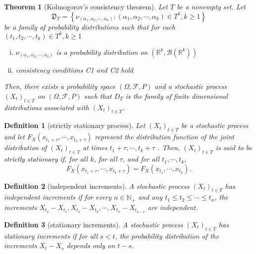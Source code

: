 \documentclass{report}
\newtheorem{definition}{Definition}[section]
\newtheorem{theorem}{Theorem}[section]
\theoremstyle{nonumberplain}
\begin{document}
\begin{theorem}[Kolmogorov's consistency theorem]
	Let $T$ be a nonempty set. Let 
	$$
	\mathfrak{D}_{T} =\left\{\nu_{\left(\alpha_{1}, \alpha_{2}, \cdots, \alpha_{k}\right)}:\left(\alpha_{1}, \alpha_{2}, \cdots, \alpha_{k}\right) \in T^{k}, k\ge1 \right\}
	$$
	be a family of probability distributions such that for each $\left(t_{1}, t_{2}, \cdots, t_{k}\right) \in T^k,k\ge1$
	\begin{enumerate}[(i)]
		\item $\nu_{\left(\alpha_{1}, \alpha_{2}, \cdots, \alpha_{k}\right)}$ is a probability distribution on $\left(\mathbb{R}^{k}, \mathcal{B}\left(\mathbb{R}^{k}\right)\right)$
		\item consistency conditions C1 and C2 hold
	\end{enumerate}
	Then, there exists a probability space $(\Omega, \mathcal{F}, P)$ and a stochastic process $(X_t)_{t\in T}$ on $(\Omega, \mathcal{F}, P)$ such that $D_{T}$ is the family of finite dimensional distributions associated with $(X_t)_{t\in T}$.
\end{theorem}





\begin{definition}[strictly stationary process]
	Let $(X_t)_{t\in T}$ be a stochastic process and let \newline $F_{{X}}(x_{{t_{1}+\tau }},\cdots ,x_{{t_{k}+\tau }})$ represent the  distribution function of the joint distribution of $(X_t)_{t\in T}$ at times $t_{1}+\tau ,\cdots ,t_{k}+\tau$ . Then, $(X_t)_{t\in T}$ is said to be strictly stationary if, for all $k$, for all $\tau$, and for all $ t_{1},\cdots ,t_{k}$,
	\[
	F_{{X}}(x_{{t_{1}+\tau }},\cdots ,x_{{t_{k}+\tau }})=F_{{X}}(x_{{t_{1}}},\cdots ,x_{{t_{k}}}).
	\]
\end{definition}

\begin{definition}[independent increments]
	A stochastic process $(X_t)_{t\in T}$ has \emph{independent increments} if for every $n\in \mathbb{N}_+$ and any $t_1\le t_2 \le\cdots\le t_n$, the increments $X_{t_2}-X_{t_1},X_{t_3}-X_{t_2},\cdots,X_{t_n}-X_{t_{n-1}}$ are independent.
\end{definition}

\begin{definition}[stationary increments]
	A stochastic process $(X_t)_{t\in T}$ has \emph{stationary increments} if for all $s<t$, the probability distribution of the increments $X_{t}-X_{s}$ depends only on $t-s$.
\end{definition}
\end{document}
